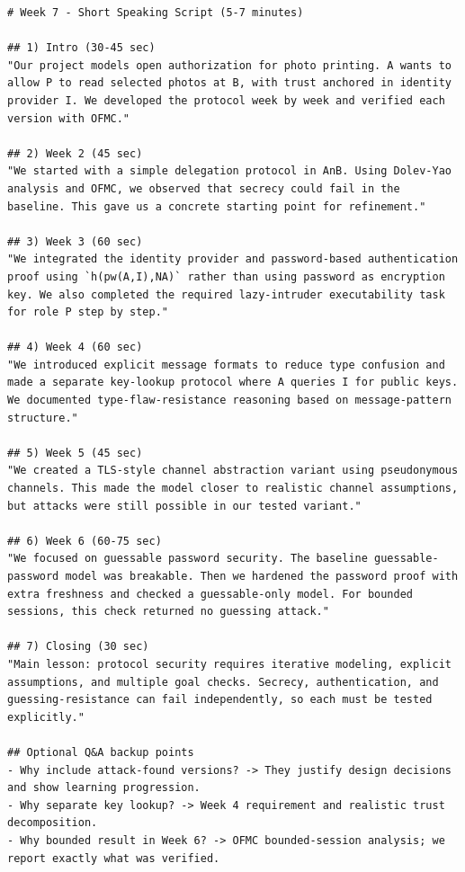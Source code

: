 \documentclass[11pt,a4paper]{article}
\begin{document}
\begin{lstlisting}
# Week 7 - Short Speaking Script (5-7 minutes)

## 1) Intro (30-45 sec)
"Our project models open authorization for photo printing. A wants to allow P to read selected photos at B, with trust anchored in identity provider I. We developed the protocol week by week and verified each version with OFMC."

## 2) Week 2 (45 sec)
"We started with a simple delegation protocol in AnB. Using Dolev-Yao analysis and OFMC, we observed that secrecy could fail in the baseline. This gave us a concrete starting point for refinement."

## 3) Week 3 (60 sec)
"We integrated the identity provider and password-based authentication proof using `h(pw(A,I),NA)` rather than using password as encryption key. We also completed the required lazy-intruder executability task for role P step by step."

## 4) Week 4 (60 sec)
"We introduced explicit message formats to reduce type confusion and made a separate key-lookup protocol where A queries I for public keys. We documented type-flaw-resistance reasoning based on message-pattern structure."

## 5) Week 5 (45 sec)
"We created a TLS-style channel abstraction variant using pseudonymous channels. This made the model closer to realistic channel assumptions, but attacks were still possible in our tested variant."

## 6) Week 6 (60-75 sec)
"We focused on guessable password security. The baseline guessable-password model was breakable. Then we hardened the password proof with extra freshness and checked a guessable-only model. For bounded sessions, this check returned no guessing attack."

## 7) Closing (30 sec)
"Main lesson: protocol security requires iterative modeling, explicit assumptions, and multiple goal checks. Secrecy, authentication, and guessing-resistance can fail independently, so each must be tested explicitly."

## Optional Q&A backup points
- Why include attack-found versions? -> They justify design decisions and show learning progression.
- Why separate key lookup? -> Week 4 requirement and realistic trust decomposition.
- Why bounded result in Week 6? -> OFMC bounded-session analysis; we report exactly what was verified.
\end{lstlisting}
\end{document}
